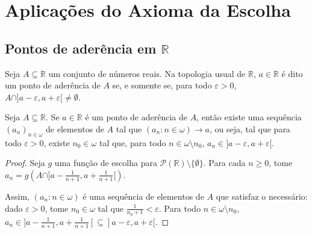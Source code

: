 \section{Aplicações do Axioma da Escolha}\label{sec:aplicacoes}

\subsection{Pontos de aderência em \texorpdfstring{$\mathbb R$}{R}}
Seja $A\subseteq \mathbb R$ um conjunto de números reais.
Na topologia usual de $\mathbb R$, $a \in \mathbb R$ é dito um ponto de aderência de $A$ se, e somente se, para todo $\varepsilon>0$, $A\cap ]a-\varepsilon, a+\varepsilon[\neq \emptyset$.

\begin{proposition}[$ZFC^-$]\label{prop:existenciaDePontoDeAderencia}
    Seja $A\subseteq \mathbb R$.
    Se $a \in \mathbb R$ é um ponto de aderência de $A$, então existe uma sequência $(a_n)_{n\in \omega}$ de elementos de $A$ tal que $(a_n: n \in \omega)\rightarrow a$, ou seja, tal que para todo $\varepsilon>0$, existe $n_0\in \omega$ tal que, para todo $n\in \omega\setminus n_0$, $a_n\in ]a-\varepsilon, a+\varepsilon[$.
\end{proposition}
\begin{proof}
    Seja $g$ uma função de escolha para $\mathcal P(\mathbb R)\setminus\{\emptyset\}$.
    Para cada $n\geq 0$, tome $a_n=g\left(A\cap ]a-\frac{1}{n+1}, a+\frac{1}{n+1}[\right)$.
    
    Assim, $(a_n: n \in \omega)$ é uma sequência de elementos de $A$ que satisfaz o necessário: dado $\varepsilon>0$, tome $n_0\in \omega$ tal que $\frac{1}{n_0+1}<\varepsilon$.
    Para todo $n\in \omega\setminus n_0$, $a_n\in ]a-\frac{1}{n+1}, a+\frac{1}{n+1}[\subseteq ]a-\varepsilon, a+\varepsilon[$.
\end{proof}
